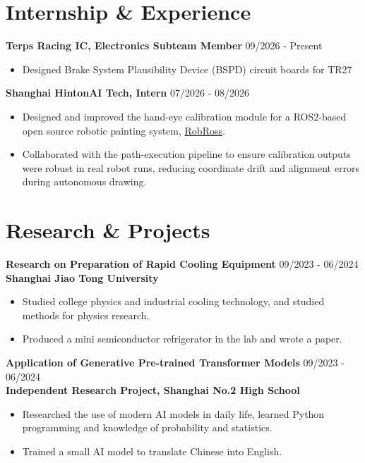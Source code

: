 \documentclass[letterpaper,10pt]{article}
\begin{document}
\section{Internship \& Experience}
\noindent \textbf{Terps Racing IC, Electronics Subteam Member} \hfill 09/2026 - Present
\begin{itemize}
    \item Designed Brake System Plausibility Device (BSPD) circuit boards for TR27
\end{itemize}
\noindent \textbf{Shanghai HintonAI Tech, Intern} \hfill 07/2026 - 08/2026
\begin{itemize}
    \item Designed and improved the hand-eye calibration module for a ROS2-based open source robotic painting system, \href{https://github.com/dwarfguard/RobRoss}{RobRoss}.
    \item Collaborated with the path-execution pipeline to ensure calibration outputs were robust in real robot runs, reducing coordinate drift and alignment errors during autonomous drawing.
\end{itemize}


\section{Research \& Projects}
\noindent \textbf{Research on Preparation of Rapid Cooling Equipment} \hfill 09/2023 - 06/2024 \\ \textbf{Shanghai Jiao Tong University}
\begin{itemize}
    \item Studied college physics and industrial cooling technology, and studied methods for physics research.
    \item Produced a mini semiconductor refrigerator in the lab and wrote a paper.
\end{itemize}
\noindent \textbf{Application of Generative Pre-trained Transformer Models} \hfill 09/2023 - 06/2024 \\ \textbf{Independent Research Project, Shanghai No.2 High School}
\begin{itemize}
    \item Researched the use of modern AI models in daily life, learned Python programming and knowledge of probability and statistics.
    \item Trained a small AI model to translate Chinese into English.
\end{itemize}

\end{document}
